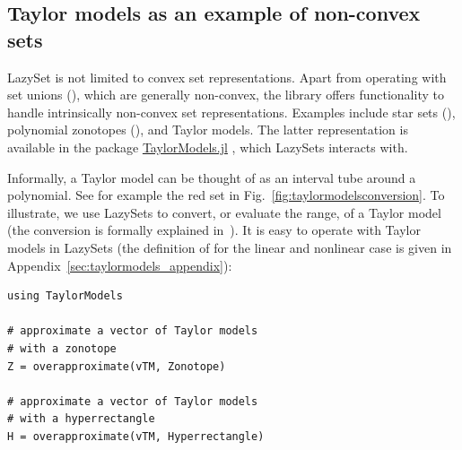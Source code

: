 \subsection{Taylor models as an example of non-convex sets}\label{sec:taylormodels}

LazySet is not limited to convex set representations. Apart from operating with set unions (), which are generally non-convex, the library offers functionality to handle intrinsically non-convex set representations.
%
Examples include star sets (), polynomial zonotopes (), and Taylor models. The latter representation is available in the package \href{https://github.com/JuliaIntervals/TaylorModels.jl}{TaylorModels.jl} \cite{TaylorModels.jl,BenetFSS19}, which LazySets interacts with.

\smallskip

Informally, a Taylor model can be thought of as an interval tube around a polynomial.
See for example the red set in Fig.~\ref{fig:taylormodelsconversion}.
%
To illustrate, we use LazySets to convert, or evaluate the range, of a Taylor model (the conversion is formally explained in~\cite{schilling2021verification}).
%
It is easy to operate with Taylor models in LazySets (the definition of  for the linear and nonlinear case is given in Appendix~\ref{sec:taylormodels_appendix}):

\begin{minipage}{\linewidth}
	\vspace{-\abovedisplayskip}
	\begin{lstlisting}
using TaylorModels

# approximate a vector of Taylor models
# with a zonotope
Z = overapproximate(vTM, Zonotope)

# approximate a vector of Taylor models
# with a hyperrectangle
H = overapproximate(vTM, Hyperrectangle)
	\end{lstlisting}
\end{minipage}

